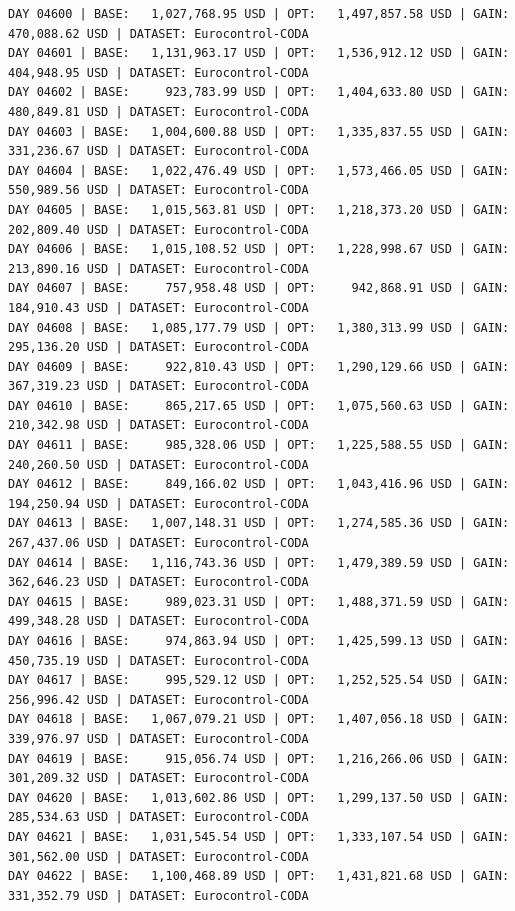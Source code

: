 \documentclass[11pt,a4paper]{article}
\begin{document}
\begin{verbatim}
DAY 04600 | BASE:   1,027,768.95 USD | OPT:   1,497,857.58 USD | GAIN: 470,088.62 USD | DATASET: Eurocontrol-CODA
DAY 04601 | BASE:   1,131,963.17 USD | OPT:   1,536,912.12 USD | GAIN: 404,948.95 USD | DATASET: Eurocontrol-CODA
DAY 04602 | BASE:     923,783.99 USD | OPT:   1,404,633.80 USD | GAIN: 480,849.81 USD | DATASET: Eurocontrol-CODA
DAY 04603 | BASE:   1,004,600.88 USD | OPT:   1,335,837.55 USD | GAIN: 331,236.67 USD | DATASET: Eurocontrol-CODA
DAY 04604 | BASE:   1,022,476.49 USD | OPT:   1,573,466.05 USD | GAIN: 550,989.56 USD | DATASET: Eurocontrol-CODA
DAY 04605 | BASE:   1,015,563.81 USD | OPT:   1,218,373.20 USD | GAIN: 202,809.40 USD | DATASET: Eurocontrol-CODA
DAY 04606 | BASE:   1,015,108.52 USD | OPT:   1,228,998.67 USD | GAIN: 213,890.16 USD | DATASET: Eurocontrol-CODA
DAY 04607 | BASE:     757,958.48 USD | OPT:     942,868.91 USD | GAIN: 184,910.43 USD | DATASET: Eurocontrol-CODA
DAY 04608 | BASE:   1,085,177.79 USD | OPT:   1,380,313.99 USD | GAIN: 295,136.20 USD | DATASET: Eurocontrol-CODA
DAY 04609 | BASE:     922,810.43 USD | OPT:   1,290,129.66 USD | GAIN: 367,319.23 USD | DATASET: Eurocontrol-CODA
DAY 04610 | BASE:     865,217.65 USD | OPT:   1,075,560.63 USD | GAIN: 210,342.98 USD | DATASET: Eurocontrol-CODA
DAY 04611 | BASE:     985,328.06 USD | OPT:   1,225,588.55 USD | GAIN: 240,260.50 USD | DATASET: Eurocontrol-CODA
DAY 04612 | BASE:     849,166.02 USD | OPT:   1,043,416.96 USD | GAIN: 194,250.94 USD | DATASET: Eurocontrol-CODA
DAY 04613 | BASE:   1,007,148.31 USD | OPT:   1,274,585.36 USD | GAIN: 267,437.06 USD | DATASET: Eurocontrol-CODA
DAY 04614 | BASE:   1,116,743.36 USD | OPT:   1,479,389.59 USD | GAIN: 362,646.23 USD | DATASET: Eurocontrol-CODA
DAY 04615 | BASE:     989,023.31 USD | OPT:   1,488,371.59 USD | GAIN: 499,348.28 USD | DATASET: Eurocontrol-CODA
DAY 04616 | BASE:     974,863.94 USD | OPT:   1,425,599.13 USD | GAIN: 450,735.19 USD | DATASET: Eurocontrol-CODA
DAY 04617 | BASE:     995,529.12 USD | OPT:   1,252,525.54 USD | GAIN: 256,996.42 USD | DATASET: Eurocontrol-CODA
DAY 04618 | BASE:   1,067,079.21 USD | OPT:   1,407,056.18 USD | GAIN: 339,976.97 USD | DATASET: Eurocontrol-CODA
DAY 04619 | BASE:     915,056.74 USD | OPT:   1,216,266.06 USD | GAIN: 301,209.32 USD | DATASET: Eurocontrol-CODA
DAY 04620 | BASE:   1,013,602.86 USD | OPT:   1,299,137.50 USD | GAIN: 285,534.63 USD | DATASET: Eurocontrol-CODA
DAY 04621 | BASE:   1,031,545.54 USD | OPT:   1,333,107.54 USD | GAIN: 301,562.00 USD | DATASET: Eurocontrol-CODA
DAY 04622 | BASE:   1,100,468.89 USD | OPT:   1,431,821.68 USD | GAIN: 331,352.79 USD | DATASET: Eurocontrol-CODA

\end{verbatim}
\end{document}
